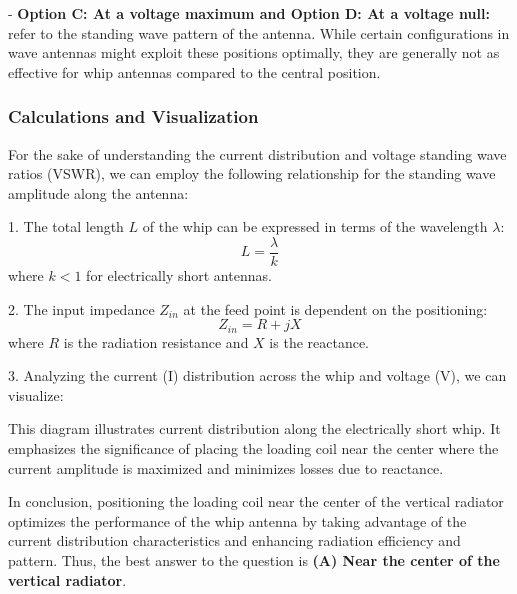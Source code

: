 - \textbf{Option C: At a voltage maximum\textbf{ and }Option D: At a voltage null:} refer to the standing wave pattern of the antenna. While certain configurations in wave antennas might exploit these positions optimally, they are generally not as effective for whip antennas compared to the central position.

\subsubsection{Calculations and Visualization}

For the sake of understanding the current distribution and voltage standing wave ratios (VSWR), we can employ the following relationship for the standing wave amplitude along the antenna:

1. The total length \(L\) of the whip can be expressed in terms of the wavelength \(\lambda\):
   \[
   L = \frac{\lambda}{k}
   \]
   where \(k < 1\) for electrically short antennas.

2. The input impedance \(Z_{in}\) at the feed point is dependent on the positioning:
   \[
   Z_{in} = R + jX
   \]
   where \(R\) is the radiation resistance and \(X\) is the reactance.

3. Analyzing the current (I) distribution across the whip and voltage (V), we can visualize:
   \begin{center}
   \end{center}

This diagram illustrates current distribution along the electrically short whip. It emphasizes the significance of placing the loading coil near the center where the current amplitude is maximized and minimizes losses due to reactance.

In conclusion, positioning the loading coil near the center of the vertical radiator optimizes the performance of the whip antenna by taking advantage of the current distribution characteristics and enhancing radiation efficiency and pattern. Thus, the best answer to the question is \textbf{(A) Near the center of the vertical radiator}. 
